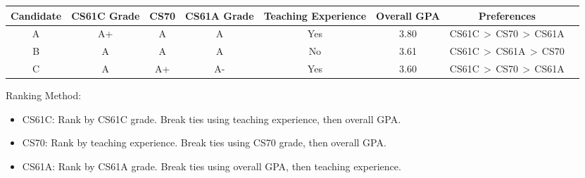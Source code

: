 \documentclass{article}
\begin{document}
\vspace{3mm}

\begin{center}
\begin{tabular}{ |c||c|c|c|c|c|c|c| } 
\hline
 Candidate & CS61C Grade & CS70 & CS61A Grade & Teaching Experience & Overall GPA & Preferences \\ 
  \hline
A & A+ & A    & A   & Yes & 3.80 & CS61C$\,>\,$CS70$\,>\,$CS61A \\
B & A   & A    & A   & No  & 3.61 & CS61C$\,>\,$CS61A$\,>\,$CS70 \\
C & A   & A+ & A-  & Yes & 3.60 & CS61C$\,>\,$CS70$\,>\,$CS61A \\
\hline
\end{tabular}
\end{center}

\vspace{3mm}
Ranking Method:
\begin{itemize}
\item CS61C: Rank by CS61C grade. Break ties using teaching experience, then overall GPA.
\item CS70: Rank by teaching experience. Break ties using CS70 grade, then overall GPA.
\item CS61A: Rank by CS61A grade. Break ties using overall GPA, then teaching experience.
\end{itemize}
\end{document}
